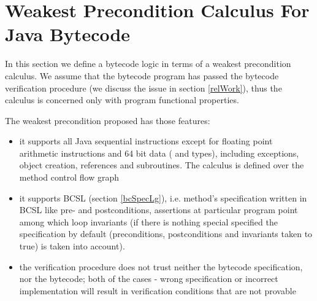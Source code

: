 
\section{Weakest Precondition Calculus For Java Bytecode}\label{wpbc}
In this section we define a bytecode logic in terms of a weakest precondition calculus.
We assume that the bytecode program has passed the bytecode verification procedure (we discuss the issue in section \ref{relWork}), thus the calculus is concerned only with 
 program functional properties. 

The weakest precondition proposed has those features:
\begin{itemize}
\item it supports all Java sequential instructions except for floating point arithmetic instructions and 64 bit data ( and  types), including 
exceptions, object creation, references and subroutines. The calculus is defined over the method control flow graph

\item it supports BCSL (section \ref{bcSpecLg}), i.e. method's specification written in BCSL like pre- and postconditions, assertions at particular program point among 
which loop invariants (if there is nothing special specified the specification by default (preconditions, postconditions and invariants taken to true) is taken into account). %
\item the verification procedure does not trust neither the bytecode specification, nor the bytecode; both of the cases - wrong 
specification or incorrect implementation will result in verification conditions that are not provable 
\end{itemize}


